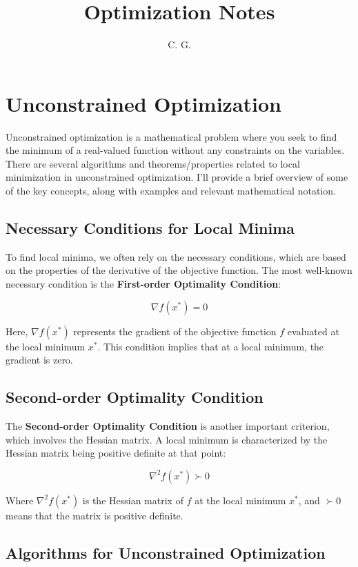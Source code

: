 \documentclass[a4paper]{article}
\title{Optimization Notes}
\author{C. G.}
\begin{document}
\maketitle
\tableofcontents
\newpage
\section{Unconstrained Optimization}

Unconstrained optimization is a mathematical problem where you seek to find the minimum of a real-valued function without any constraints on the variables. There are several algorithms and theorems/properties related to local minimization in unconstrained optimization. I'll provide a brief overview of some of the key concepts, along with examples and relevant mathematical notation.

\subsection{Necessary Conditions for Local Minima}

To find local minima, we often rely on the necessary conditions, which are based on the properties of the derivative of the objective function. The most well-known necessary condition is the \textbf{First-order Optimality Condition}:

\[
\nabla f(x^*) = 0
\]

Here, $\nabla f(x^*)$ represents the gradient of the objective function $f$ evaluated at the local minimum $x^*$. This condition implies that at a local minimum, the gradient is zero.

\subsection{Second-order Optimality Condition}

The \textbf{Second-order Optimality Condition} is another important criterion, which involves the Hessian matrix. A local minimum is characterized by the Hessian matrix being positive definite at that point:

\[
\nabla^2 f(x^*) \succ 0
\]

Where $\nabla^2 f(x^*)$ is the Hessian matrix of $f$ at the local minimum $x^*$, and $\succ 0$ means that the matrix is positive definite.

\subsection{Algorithms for Unconstrained Optimization}
\end{document}

